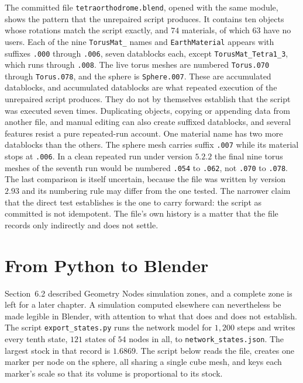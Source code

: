 The committed file \texttt{tetraorthodrome.blend}, opened with the same module, shows the pattern that the unrepaired script produces. It contains ten objects whose rotations match the script exactly, and $74$ materials, of which $63$ have no users. Each of the nine \texttt{TorusMat\_} names and \texttt{EarthMaterial} appears with suffixes \texttt{.000} through \texttt{.006}, seven datablocks each, except \texttt{TorusMat\_Tetra1\_3}, which runs through \texttt{.008}. The live torus meshes are numbered \texttt{Torus.070} through \texttt{Torus.078}, and the sphere is \texttt{Sphere.007}. These are accumulated datablocks, and accumulated datablocks are what repeated execution of the unrepaired script produces. They do not by themselves establish that the script was executed seven times. Duplicating objects, copying or appending data from another file, and manual editing can also create suffixed datablocks, and several features resist a pure repeated-run account. One material name has two more datablocks than the others. The sphere mesh carries suffix \texttt{.007} while its material stops at \texttt{.006}. In a clean repeated run under version $5.2.2$ the final nine torus meshes of the seventh run would be numbered \texttt{.054} to \texttt{.062}, not \texttt{.070} to \texttt{.078}. The last comparison is itself uncertain, because the file was written by version $2.93$ and its numbering rule may differ from the one tested. The narrower claim that the direct test establishes is the one to carry forward: the script as committed is not idempotent. The file's own history is a matter that the file records only indirectly and does not settle.

\section{From Python to Blender}

Section~6.2 described Geometry Nodes simulation zones, and a complete zone is left for a later chapter. A simulation computed elsewhere can nevertheless be made legible in Blender, with attention to what that does and does not establish. The script \texttt{export\_states.py} runs the network model for $1{,}200$ steps and writes every tenth state, $121$ states of $54$ nodes in all, to \texttt{network\_states.json}. The largest stock in that record is $1.6869$. The script below reads the file, creates one marker per node on the sphere, all sharing a single cube mesh, and keys each marker's scale so that its volume is proportional to its stock.

